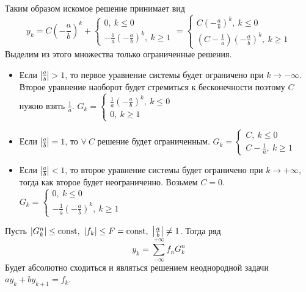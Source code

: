 \begin{example}
  Таким образом искомое решение принимает вид
  \[y_k=C\left(-\frac{a}{b}\right)^k + \begin{cases}
      0,\ k\leq 0 \\
      -\frac{1}{a}\left(-\frac{a}{b}\right)^k,\ k\geq1
    \end{cases}= \begin{cases}
      C\left(-\frac{a}{b}\right)^k,\ k\leq 0 \\
      \left(C-\frac{1}{a}\right)\left(-\frac{a}{b}\right)^k,\ k\geq1
    \end{cases}\]
  Выделим из этого множества только ограниченные решения.
  \begin{itemize}
    \item Если $\left|\frac{a}{b}\right|>1$, то первое
          уравнение системы будет ограничено при $k\rightarrow-\infty$.
          Второе уравнение наоборот будет стремиться к бесконечности
          поэтому $C$ нужно взять $\frac{1}{a}$.
          $ G_k=\begin{cases}
              \frac{1}{a}\left(-\frac{a}{b}\right)^k,\ k\leq 0 \\
              0,\ k\geq1
            \end{cases}$
    \item Если $\left|\frac{a}{b}\right|=1$, то $\forall\ C$ решение будет ограниченным.
          $G_k=\begin{cases}
              C,\ k\leq 0 \\
              C-\frac{1}{a},\ k\geq1
            \end{cases}$
    \item Если $\left|\frac{a}{b}\right|<1$, то второе уравнение системы
          будет ограничено при $k\rightarrow+\infty$, тогда как
          второе будет неограниченно. Возьмем $C=0$.
          $G_k=\begin{cases}
              0,\ k\leq 0 \\
              -\frac{1}{a}\left(-\frac{a}{b}\right)^k,\ k\geq1
            \end{cases}$
  \end{itemize}
\end{example}
\begin{theorem}
  Пусть $|G_k^n|\leq\mathrm{const},\ |f_k|\leq F=\mathrm{const},\ \left|\frac{a}{b}\right|\neq1$. Тогда ряд
  \[y_k=\sum_{-\infty}^{+\infty}f_nG_k^n\]
  Будет абсолютно сходиться и являться решением неоднородной
  задачи $ay_k+by_{k+1}=f_k$.
\end{theorem}

